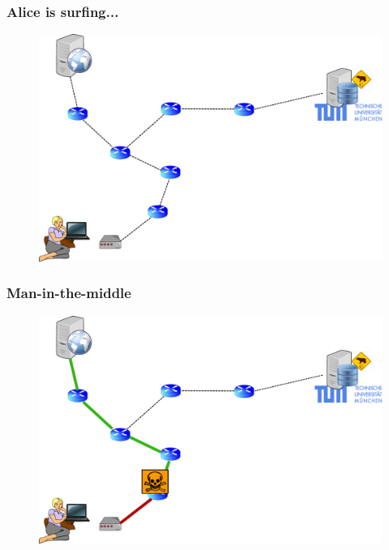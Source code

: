 \begin{frame}
  \frametitle{Alice is surfing...}
  \begin{block}{}
    \vskip -1.2cm
    \begin{figure}[t]
      \centering
      \includegraphics[scale=.36]{figures/reporting}
    \end{figure}
  \end{block}
\end{frame}

\begin{frame}
  \frametitle{Man-in-the-middle}
  \begin{block}{}
    \vskip -1.1cm
    \begin{figure}[t]
      \centering
      \includegraphics[scale=.36]{figures/reporting-2-attacked}
    \end{figure}
  \end{block}
\end{frame}

